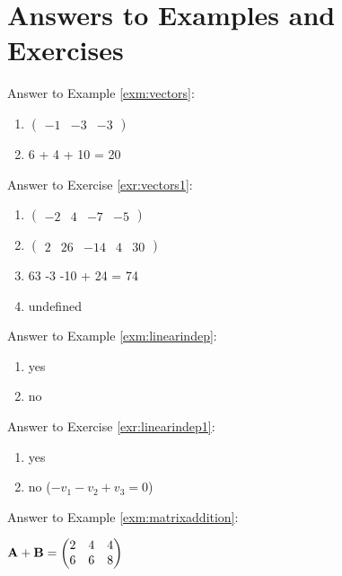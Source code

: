 \documentclass[]{book}
\providecommand{\tightlist}{%
  \setlength{\itemsep}{0pt}\setlength{\parskip}{0pt}}
\theoremstyle{definition}
\theoremstyle{definition}
\theoremstyle{definition}
\theoremstyle{remark}
\begin{document}
\section*{Answers to Examples and
Exercises}\label{answers-to-examples-and-exercises}

Answer to Example \ref{exm:vectors}:

\begin{enumerate}
\def\labelenumi{\arabic{enumi}.}
\tightlist
\item
  \(\begin{pmatrix} -1 &-3&-3 \end{pmatrix}\)
\item
  6 + 4 + 10 = 20
\end{enumerate}

Answer to Exercise \ref{exr:vectors1}:

\begin{enumerate}
\def\labelenumi{\arabic{enumi}.}
\tightlist
\item
  \(\begin{pmatrix} -2 &4&-7&-5 \end{pmatrix}\)
\item
  \(\begin{pmatrix} 2 &26&-14&4&30 \end{pmatrix}\)
\item
  63 -3 -10 + 24 = 74
\item
  undefined
\end{enumerate}

Answer to Example \ref{exm:linearindep}:

\begin{enumerate}
\def\labelenumi{\arabic{enumi}.}
\tightlist
\item
  yes
\item
  no
\end{enumerate}

Answer to Exercise \ref{exr:linearindep1}:

\begin{enumerate}
\def\labelenumi{\arabic{enumi}.}
\tightlist
\item
  yes
\item
  no (\(-v_1 -v_2 + v_3 = 0\))
\end{enumerate}

Answer to Example \ref{exm:matrixaddition}:

\({\bf A+B}=\begin{pmatrix} 2 & 4 & 4 \\ 6 & 6 & 8 \end{pmatrix}\)
\end{document}
